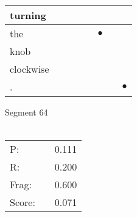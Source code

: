 \documentclass[landscape]{article}
\newcommand{\ssp}{\hspace{2pt}}
\newcommand{\mex}{\cellcolor{g}$\bullet$}
\begin{document}
\begin{tabular}{|l|p{10pt}|p{10pt}|p{10pt}|p{10pt}|p{10pt}|p{10pt}|p{10pt}|}
\hline
\ssp turning \ssp&\hspace{2pt}&\hspace{2pt}&\hspace{2pt}&\hspace{2pt}&\hspace{2pt}&\hspace{2pt}&\hspace{2pt}\\
\hline
\ssp \cellcolor{ref4}the \ssp&\hspace{2pt}&\hspace{2pt}&\hspace{2pt}&\hspace{2pt}&\hspace{2pt}\mex&\hspace{2pt}&\hspace{2pt}\\
\hline
\ssp knob \ssp&\hspace{2pt}&\hspace{2pt}&\hspace{2pt}&\hspace{2pt}&\hspace{2pt}&\hspace{2pt}&\hspace{2pt}\\
\hline
\ssp clockwise \ssp&\hspace{2pt}&\hspace{2pt}&\hspace{2pt}&\hspace{2pt}&\hspace{2pt}&\hspace{2pt}&\hspace{2pt}\\
\hline
\ssp \cellcolor{ref6}. \ssp&\hspace{2pt}&\hspace{2pt}&\hspace{2pt}&\hspace{2pt}&\hspace{2pt}&\hspace{2pt}&\hspace{2pt}\mex\\
\hline
\end{tabular}

\vspace{6pt}
\noindent Segment 64\\\\
\noindent\begin{tabular}{lm{12pt}r}
\hline
P:&&0.111\\
R:&&0.200\\
Frag:&&0.600\\
Score:&&0.071\\
\end{tabular}
\end{document}

